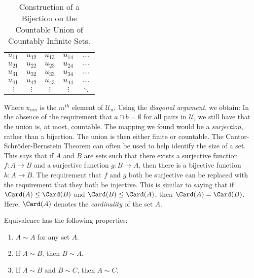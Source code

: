         \begin{table}[H]
            \captionsetup{type=table}
            \centering
            \begin{tabular}{ccccc}
                $u_{11}$&$u_{12}$&$u_{13}$
                &$u_{14}$&$\hdots$\\
                $u_{21}$&$u_{22}$&$u_{23}$
                &$u_{24}$&$\hdots$\\
                $u_{31}$&$u_{32}$&$u_{33}$
                &$u_{34}$&$\hdots$\\
                $u_{41}$&$u_{42}$&$u_{43}$
                &$u_{44}$&$\hdots$\\
                $\vdots$&$\vdots$&$\vdots$
                &$\vdots$&$\ddots$
            \end{tabular}
            \caption{Construction of a Bijection on the
                     Countable Union of Countably Infinite
                     Sets.}
            \label{table:Countable_Union_of_Countable}
        \end{table}
        Where $u_{nm}$ is the $m^{th}$ element of
        $\mathcal{U}_{n}$.
        Using the \textit{diagonal argument},
        we obtain:
        In the absence of the requirement that
        $a\cap{b}=\emptyset$ for all pairs in $\mathcal{U}$,
        we still have that the union is, at most, countable.
        The mapping we found would be a
        \textit{surjection}, rather than a bijection.
        The union is then either finite or countable. The
        Cantor-Schr\"{o}der-Bernstein Theorem can often be
        used to help identify the size of a set. This says
        that if $A$ and $B$ are sets such that there exists
        a surjective function $f:A\rightarrow{B}$ and a
        surjective function $g:B\rightarrow{A}$, then there
        is a bijective function $h:A\rightarrow{B}$. The
        requirement that $f$ and $g$ both be surjective
        can be replaced with the requirement that they both
        be injective. This is similar to saying that if
        $\Card(A)\leq\Card(B)$ and $\Card(B)\leq\Card(A)$,
        then $\Card(A)=\Card(B)$. Here, $\Card(A)$ denotes
        the \textit{cardinality} of the set $A$.
        \begin{theorem}
            Equivalence has the following properties:
            \begin{enumerate}
                \item   $A\sim A$ for any set $A$.
                \item   If $A\sim B$, then $B\sim A$.
                \item   If $A\sim B$ and $B\sim C$, then $A\sim C$.
            \end{enumerate}
        \end{theorem}
